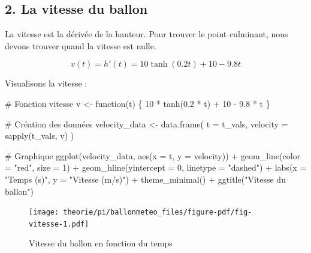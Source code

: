 \documentclass[
  12pt,
  letterpaper,
]{book}
\newenvironment{Shaded}{}{}
\newcommand{\AttributeTok}[1]{\textcolor[rgb]{0.84,0.23,0.29}{#1}}
\newcommand{\CommentTok}[1]{\textcolor[rgb]{0.42,0.45,0.49}{#1}}
\newcommand{\ControlFlowTok}[1]{\textcolor[rgb]{0.84,0.23,0.29}{#1}}
\newcommand{\DecValTok}[1]{\textcolor[rgb]{0.00,0.36,0.77}{#1}}
\newcommand{\FloatTok}[1]{\textcolor[rgb]{0.00,0.36,0.77}{#1}}
\newcommand{\FunctionTok}[1]{\textcolor[rgb]{0.44,0.26,0.76}{#1}}
\newcommand{\NormalTok}[1]{\textcolor[rgb]{0.14,0.16,0.18}{#1}}
\newcommand{\OtherTok}[1]{\textcolor[rgb]{0.44,0.26,0.76}{#1}}
\newcommand{\SpecialCharTok}[1]{\textcolor[rgb]{0.00,0.36,0.77}{#1}}
\newcommand{\StringTok}[1]{\textcolor[rgb]{0.01,0.18,0.38}{#1}}
\theoremstyle{remark}
\begin{document}
\hypertarget{la-vitesse-du-ballon}{%
\subsection{2. La vitesse du ballon}\label{la-vitesse-du-ballon}}

La vitesse est la dérivée de la hauteur. Pour trouver le point
culminant, nous devons trouver quand la vitesse est nulle.

\[v(t) = h'(t) = 10\tanh(0.2t) + 10 - 9.8t\]

Visualisons la vitesse :

\begin{Shaded}
\begin{Highlighting}[]
\CommentTok{\# Fonction vitesse}
\NormalTok{v }\OtherTok{\textless{}{-}} \ControlFlowTok{function}\NormalTok{(t) \{}
  \DecValTok{10} \SpecialCharTok{*} \FunctionTok{tanh}\NormalTok{(}\FloatTok{0.2} \SpecialCharTok{*}\NormalTok{ t) }\SpecialCharTok{+} \DecValTok{10} \SpecialCharTok{{-}} \FloatTok{9.8} \SpecialCharTok{*}\NormalTok{ t}
\NormalTok{\}}

\CommentTok{\# Création des données}
\NormalTok{velocity\_data }\OtherTok{\textless{}{-}} \FunctionTok{data.frame}\NormalTok{(}
  \AttributeTok{t =}\NormalTok{ t\_vals,}
  \AttributeTok{velocity =} \FunctionTok{sapply}\NormalTok{(t\_vals, v)}
\NormalTok{)}

\CommentTok{\# Graphique}
\FunctionTok{ggplot}\NormalTok{(velocity\_data, }\FunctionTok{aes}\NormalTok{(}\AttributeTok{x =}\NormalTok{ t, }\AttributeTok{y =}\NormalTok{ velocity)) }\SpecialCharTok{+}
  \FunctionTok{geom\_line}\NormalTok{(}\AttributeTok{color =} \StringTok{"red"}\NormalTok{, }\AttributeTok{size =} \DecValTok{1}\NormalTok{) }\SpecialCharTok{+}
  \FunctionTok{geom\_hline}\NormalTok{(}\AttributeTok{yintercept =} \DecValTok{0}\NormalTok{, }\AttributeTok{linetype =} \StringTok{"dashed"}\NormalTok{) }\SpecialCharTok{+}
  \FunctionTok{labs}\NormalTok{(}\AttributeTok{x =} \StringTok{"Temps (s)"}\NormalTok{, }\AttributeTok{y =} \StringTok{"Vitesse (m/s)"}\NormalTok{) }\SpecialCharTok{+}
  \FunctionTok{theme\_minimal}\NormalTok{() }\SpecialCharTok{+}
  \FunctionTok{ggtitle}\NormalTok{(}\StringTok{"Vitesse du ballon"}\NormalTok{)}
\end{Highlighting}
\end{Shaded}

\begin{figure}[H]

{\centering \texttt{[image: theorie/pi/ballonmeteo\_files/figure-pdf/fig-vitesse-1.pdf]}

}

\caption{\label{fig-vitesse}Vitesse du ballon en fonction du temps}

\end{figure}
\end{document}
